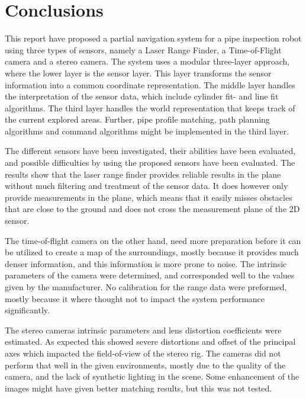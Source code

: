
\chapter{Conclusions}
\label{chap9}
This report have proposed a partial navigation system for a pipe inspection robot using three
types of sensors, namely a Laser Range Finder, a Time-of-Flight camera and a stereo
camera. The system uses a modular three-layer approach, where the lower layer is the
sensor layer. This layer transforms the sensor information into a common coordinate
representation. The middle layer handles the interpretation of the sensor data, which include cylinder fit-
and line fit algorithms. The third layer handles the world representation that keeps track of
the current explored areas. Further, pipe profile matching, path planning algorithms and command
algorithms might be implemented in the third layer.

The different sensors have been investigated, their abilities have been
evaluated, and possible difficulties by using the proposed sensors have been evaluated.
The results show that the laser range finder provides reliable results in the plane without much
filtering and treatment of the sensor data. It does however only provide measurements in the
plane, which means that it easily misses obstacles that are close to the ground and does
not cross the measurement plane of the 2D sensor. 

The time-of-flight camera on the other hand,
need more preparation before it can be utilized to create a map of the surroundings,
mostly because it provides much denser information, and this information is more prone to
noise. The intrinsic parameters of the camera were determined, and corresponded well to
the values given by the manufacturer. No calibration for the range data were preformed, 
mostly because it where thought not to impact the system performance significantly. 

The stereo cameras intrinsic parameters and lens distortion coefficients were estimated.
As expected this showed severe distortions and offset of the principal axes which impacted
the field-of-view of the stereo rig. The cameras did not perform that well in the given
environments, mostly due to the quality of the camera, and the lack of synthetic
lighting in the scene. Some enhancement of the images might have given better matching
results, but this was not tested.

